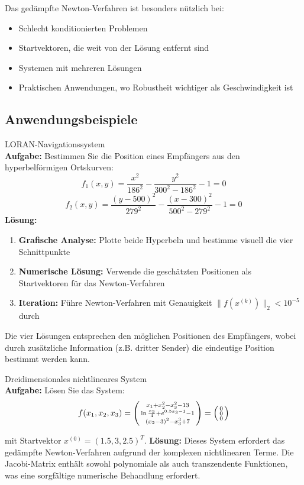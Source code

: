 \begin{remark}
Das gedämpfte Newton-Verfahren ist besonders nützlich bei:
\begin{itemize}
    \item Schlecht konditionierten Problemen
    \item Startvektoren, die weit von der Lösung entfernt sind  
    \item Systemen mit mehreren Lösungen
    \item Praktischen Anwendungen, wo Robustheit wichtiger als Geschwindigkeit ist
\end{itemize}
\end{remark}

\subsection{Anwendungsbeispiele}

\begin{example2}{LORAN-Navigationssystem}\\
\textbf{Aufgabe:} Bestimmen Sie die Position eines Empfängers aus den hyperbelförmigen Ortskurven:
$$f_1(x,y) = \frac{x^2}{186^2} - \frac{y^2}{300^2 - 186^2} - 1 = 0$$
$$f_2(x,y) = \frac{(y-500)^2}{279^2} - \frac{(x-300)^2}{500^2 - 279^2} - 1 = 0$$
\tcblower
\textbf{Lösung:}
\begin{enumerate}
    \item \textbf{Grafische Analyse:} Plotte beide Hyperbeln und bestimme visuell die vier Schnittpunkte
    \item \textbf{Numerische Lösung:} Verwende die geschätzten Positionen als Startvektoren für das Newton-Verfahren
    \item \textbf{Iteration:} Führe Newton-Verfahren mit Genauigkeit $\|f(x^{(k)})\|_2 < 10^{-5}$ durch
\end{enumerate}

Die vier Lösungen entsprechen den möglichen Positionen des Empfängers, wobei durch zusätzliche Information (z.B. dritter Sender) die eindeutige Position bestimmt werden kann.
\end{example2}

\begin{example2}{Dreidimensionales nichtlineares System}\\
\textbf{Aufgabe:} Lösen Sie das System:
$$f(x_1, x_2, x_3) = \begin{psmallmatrix}
x_1 + x_2^2 - x_3^2 - 13 \\
\ln\frac{x_2}{4} + e^{0.5x_3-1} - 1 \\
(x_2 - 3)^2 - x_3^3 + 7
\end{psmallmatrix} = \begin{psmallmatrix} 0 \\ 0 \\ 0 \end{psmallmatrix}$$

mit Startvektor $x^{(0)} = (1.5, 3, 2.5)^T$.
\tcblower
\textbf{Lösung:}
Dieses System erfordert das gedämpfte Newton-Verfahren aufgrund der komplexen nichtlinearen Terme. Die Jacobi-Matrix enthält sowohl polynomiale als auch transzendente Funktionen, was eine sorgfältige numerische Behandlung erfordert.
\end{example2}

